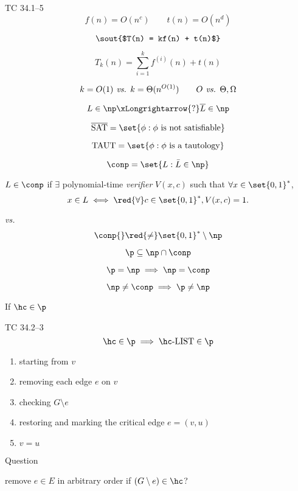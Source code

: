 
\begin{frame}{\p}
  \begin{exampleblock}{TC 34.1--5}
	\[ 
	  f(n) = O(n^c) \qquad t(n) = O(n^d)
	\]
  \end{exampleblock}

  \[
	\hbox{\sout{$T(n) = kf(n) + t(n)$}}
  \]

  \[
	T_{k}(n) = \sum_{i=1}^{k}f^{(i)}(n) + t(n) 
  \]

  \[
	k = O(1) \text{\emph{ vs. }} k = \Theta(n^{O(1)}) \qquad O \emph{\text{ vs. }} \Theta, \Omega
  \]
\end{frame}

\begin{frame}{\conp{}}
  \[
	L \in \np \xLongrightarrow{?} \overline{L} \in \np
  \]

  \[
	\overline{\text{SAT}} = \set{\phi: \phi \text{ is not satisfiable}}
  \]

  \[
	\text{TAUT} = \set{\phi: \phi \text{ is a tautology}}
  \]

  \[
	\conp = \set{L: \bar{L} \in \np}
  \]

  \begin{definition}[\conp]
	$L \in \conp$ if $\exists$ polynomial-time \emph{verifier} $V(x,c)$ such that $\forall x \in \set{0,1}^{\ast}$,
	\[
	  x \in L \iff \red{\forall} c \in \set{0,1}^{\ast}, V(x,c) = 1.
	\]
  \end{definition}
\end{frame}

\begin{frame}{\np{} \emph{vs.} \conp{}}
  \[
	\conp{} \red{\neq} \set{0,1}^{\ast} \setminus \np
  \]

  \[
	\p \subseteq \np \cap \conp
  \]

  \[
	\p = \np \implies \np = \conp
  \]

  \[
	\np \neq \conp \implies \p \neq \np
  \]
\end{frame}

\begin{frame}{If $\hc \in \p$}
  \begin{exampleblock}{TC 34.2--3}
    \[
	  \hc \in \p \implies \hc\text{-LIST} \in \p
	\]
  \end{exampleblock}

  \begin{enumerate}
	\item starting from $v$
	\item removing each edge $e$ on $v$
	\item checking $G \setminus e$
	\item restoring and marking the critical edge $e = (v, u)$
	\item $v = u$
  \end{enumerate}

  \begin{alertblock}{Question}
	\centerline{remove $e \in E$ in arbitrary order if $(G \setminus e) \in \hc$?}
  \end{alertblock}
\end{frame}

